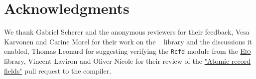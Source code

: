 \section*{Acknowledgments}

We thank Gabriel Scherer and the anonymous reviewers for their feedback, Vesa Karvonen and Carine Morel for their work on the \Saturn~\cite{saturn} library and the discussions it enabled, Thomas Leonard for suggesting verifying the \texttt{Rcfd} module from the \href{https://github.com/ocaml-multicore/eio}{\textsc{Eio}}~\cite{eio} library, Vincent Laviron and Oliver Nicole for their review of the \href{https://github.com/ocaml/ocaml/pull/13404}{"Atomic record fields"} pull request to the \OCaml compiler.
